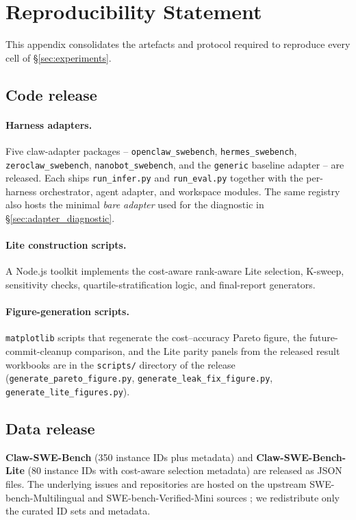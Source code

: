 \section{Reproducibility Statement}\label{appendix:reproducibility}

This appendix consolidates the artefacts and protocol required to reproduce every cell of \S\ref{sec:experiments}.

\subsection{Code release}

\paragraph{Harness adapters.} Five claw-adapter packages -- \texttt{openclaw\_swebench}, \texttt{hermes\_swebench}, \texttt{zeroclaw\_swebench}, \texttt{nanobot\_swebench}, and the \texttt{generic} baseline adapter -- are released. Each ships \verb|run_infer.py| and \verb|run_eval.py| together with the per-harness orchestrator, agent adapter, and workspace modules. The same registry also hosts the minimal \emph{bare adapter} used for the diagnostic in \S\ref{sec:adapter_diagnostic}.

\paragraph{Lite construction scripts.} A Node.js toolkit implements the cost-aware rank-aware Lite selection, K-sweep, sensitivity checks, quartile-stratification logic, and final-report generators.

\paragraph{Figure-generation scripts.} \texttt{matplotlib} scripts that regenerate the cost--accuracy Pareto figure, the future-commit-cleanup comparison, and the Lite parity panels from the released result workbooks are in the \texttt{scripts/} directory of the release (\texttt{generate\_pareto\_figure.py}, \texttt{generate\_leak\_fix\_figure.py}, \texttt{generate\_lite\_figures.py}).

\subsection{Data release}

\textbf{Claw-SWE-Bench} (350 instance IDs plus metadata) and \textbf{Claw-SWE-Bench-Lite} (80 instance IDs with cost-aware selection metadata) are released as JSON files. The underlying issues and repositories are hosted on the upstream SWE-bench-Multilingual and SWE-bench-Verified-Mini sources \cite{swe_smith, swebench_verified_mini}; we redistribute only the curated ID sets and metadata.

